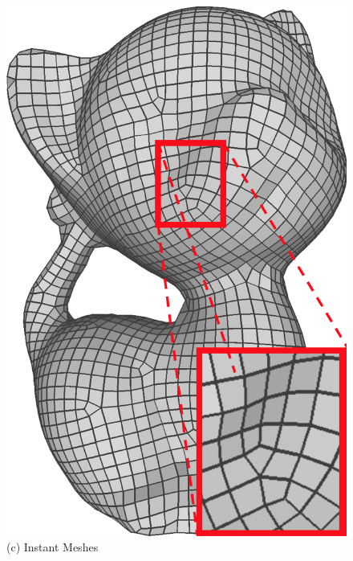 \begin{figure}
\begin{minipage}{0.16\textwidth}
  \includegraphics[width=\textwidth,height=1.33\textwidth]{quadriflow/result/area02.png}\\
   (c) Instant Meshes
   \end{minipage}
    \begin{minipage}{0.16\textwidth}
 	\centering

\end{minipage}
\end{figure}
